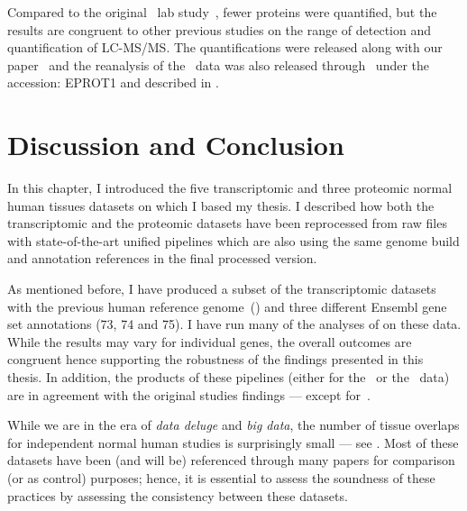 Compared to the original \pandey\ lab study~,
fewer proteins were quantified, but
the results are congruent to other previous studies on the range of detection
and quantification of \gls{LC-MS/MS}.
The quantifications were released along with our paper~
and the reanalysis of the \pandey\ data was also released
through \egxa\ under the accession: E\textminus{}PROT\textminus{}1
and described in %
\citet{EBIgxa,Wright-2016}.\mybr\

\section{Discussion and Conclusion}

In this chapter, I introduced the five transcriptomic and three proteomic normal
human tissues datasets on which I based my thesis.
I described how both the transcriptomic and the proteomic datasets have been
reprocessed from raw files with state-of-the-art unified pipelines
which are also using the same genome build and annotation references in the
final processed version.\mybr\

As mentioned before,
I have produced a subset of the transcriptomic datasets
with the previous human reference genome~() and
three different \gls{Ensembl} gene set annotations (73, 74 and 75).
I have run many of the analyses of  on
these data.
While the results may vary for individual genes,
the overall outcomes are congruent hence
supporting the robustness of the findings presented in this thesis.
In addition, the products of these pipelines (either for the \Rnaseq\ or the \ms\
data) are in agreement with the original studies findings ---
except for~\citet{PandeyData}.\mybr\

While we are in the era of \emph{data deluge} and \emph{big data},
the number of tissue overlaps for independent normal human studies is surprisingly small
--- see \Crefp{fig:VennStudiesT}.
Most of these datasets have been (and will be) referenced through
many papers for comparison (or as control) purposes;
hence, it is essential to assess the soundness of these practices by assessing
the consistency between these datasets.\mybr\

